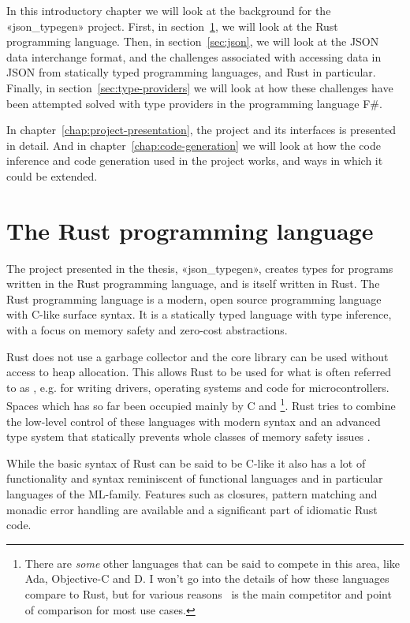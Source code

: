In this introductory chapter we will look at the background for the «json_typegen» project. First, in section~\ref{sec:rust-intro}, we will look at the Rust programming language. Then, in section~\ref{sec:json}, we will look at the JSON data interchange format, and the challenges associated with accessing data in JSON from statically typed programming languages, and Rust in particular. Finally, in section~\ref{sec:type-providers} we will look at how these challenges have been attempted solved with type providers in the programming language F\#.

In chapter~\ref{chap:project-presentation}, the project and its interfaces is presented in detail. And in chapter~\ref{chap:code-generation} we will look at how the code inference and code generation used in the project works, and ways in which it could be extended.

\section{The Rust programming language}
\label{sec:rust-intro}

The project presented in the thesis, «json_typegen», creates types for programs written in the Rust programming language, and is itself written in Rust. The Rust programming language is a modern, open source programming language with C-like surface syntax. It is a statically typed language with type inference, with a focus on memory safety and zero-cost abstractions.

Rust does not use a garbage collector and the core library can be used without access to heap allocation. This allows Rust to be used for what is often referred to as , e.g. for writing drivers, operating systems and code for microcontrollers. Spaces which has so far been occupied mainly by C and \cpp\footnote{There are \emph{some} other languages that can be said to compete in this area, like Ada, Objective-C and D. I won't go into the details of how these languages compare to Rust, but for various reasons \cpp\ is the main competitor and point of comparison for most use cases.}. Rust tries to combine the low-level control of these languages with modern syntax and an advanced type system that statically prevents whole classes of memory safety issues \cite{the-rust-language}.

While the basic syntax of Rust can be said to be C-like it also has a lot of functionality and syntax reminiscent of functional languages and in particular languages of the ML-family. Features such as closures, pattern matching and monadic error handling are available and a significant part of idiomatic Rust code.

